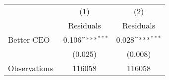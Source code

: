 {
\def\sym#1{\ifmmode^{#1}\else\(^{#1}\)\fi}
\begin{tabular}{l*{2}{c}}
\hline\hline
                    &\multicolumn{1}{c}{(1)}&\multicolumn{1}{c}{(2)}\\
                    &\multicolumn{1}{c}{Residuals}&\multicolumn{1}{c}{Residuals}\\
\hline
Better CEO          &      -0.106\sym{***}&       0.028\sym{***}\\
                    &     (0.025)         &     (0.008)         \\
\hline
Observations        &      116058         &      116058         \\
\hline\hline
\end{tabular}
}
